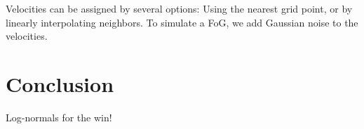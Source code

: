 \documentclass[aps,prd,reprint,floatfix,superscriptaddress,showkeys,nofootinbib]{revtex4-1}
\begin{document}
Velocities can be assigned by several options: Using the nearest grid point, or
by linearly interpolating neighbors.
To simulate a FoG, we add Gaussian noise to the velocities.





\section{Conclusion}
Log-normals for the win!







\appendix


\end{document}
